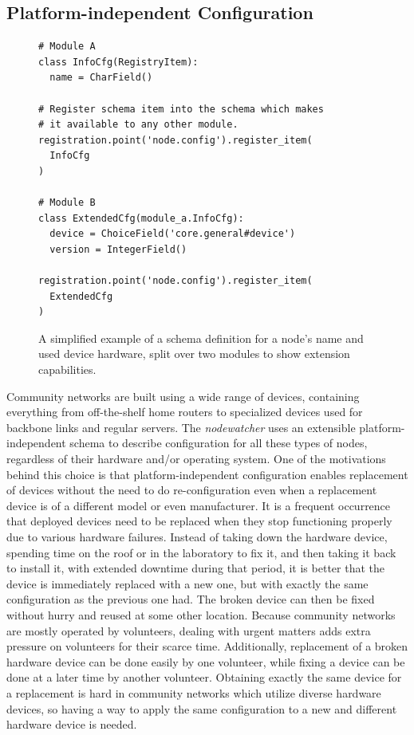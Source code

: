 \documentclass[5p,sort&compress]{elsarticle}
\newcommand{\nodewatcher}{\textit{nodewatcher}}
\begin{document}
\subsection{Platform-independent Configuration}
\label{sec:platform-independent-configuration}

\begin{figure}
\centering
\begin{verbatim}
# Module A
class InfoCfg(RegistryItem):
  name = CharField()

# Register schema item into the schema which makes
# it available to any other module.
registration.point('node.config').register_item(
  InfoCfg
)

# Module B
class ExtendedCfg(module_a.InfoCfg):
  device = ChoiceField('core.general#device')
  version = IntegerField()

registration.point('node.config').register_item(
  ExtendedCfg
)
\end{verbatim}
\caption{A simplified example of a schema definition for a node's name and used device hardware, split over two modules to show extension capabilities.}
\label{fig:schema-node-general}
\end{figure}

Community networks are built using a wide range of devices, containing everything from off-the-shelf home routers to specialized devices used for backbone links and regular servers.
The \nodewatcher{} uses an extensible platform-independent schema to describe configuration for all these types of nodes, regardless of their hardware and/or operating system.
One of the motivations behind this choice is that platform-independent configuration enables replacement of devices without the need to do re-configuration even when a replacement device is of a different model or even manufacturer.
It is a frequent occurrence that deployed devices need to be replaced when they stop functioning properly due to various hardware failures.
Instead of taking down the hardware device, spending time on the roof or in the laboratory to fix it, and then taking it back to install it, with extended downtime during that period, it is better that the device is immediately replaced with a new one, but with exactly the same configuration as the previous one had.
The broken device can then be fixed without hurry and reused at some other location.
Because community networks are mostly operated by volunteers, dealing with urgent matters adds extra pressure on volunteers for their scarce time.
Additionally, replacement of a broken hardware device can be done easily by one volunteer, while fixing a device can be done at a later time by another volunteer.
Obtaining exactly the same device for a replacement is hard in community networks which utilize diverse hardware devices, so having a way to apply the same configuration to a new and different hardware device is needed.
\end{document}
